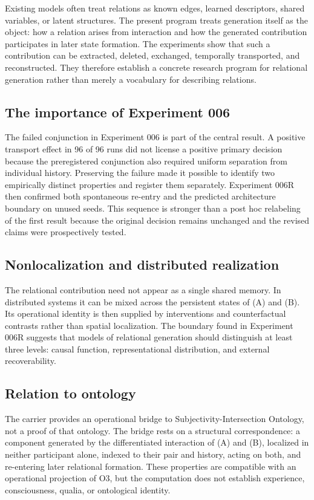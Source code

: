 \documentclass[11pt,a4paper]{article}
\begin{document}
Existing models often treat relations as known edges, learned descriptors, shared variables, or latent structures. The present program treats generation itself as the object: how a relation arises from interaction and how the generated contribution participates in later state formation. The experiments show that such a contribution can be extracted, deleted, exchanged, temporally transported, and reconstructed. They therefore establish a concrete research program for relational generation rather than merely a vocabulary for describing relations.

\subsection{The importance of Experiment 006}

The failed conjunction in Experiment 006 is part of the central result. A positive transport effect in 96 of 96 runs did not license a positive primary decision because the preregistered conjunction also required uniform separation from individual history. Preserving the failure made it possible to identify two empirically distinct properties and register them separately. Experiment 006R then confirmed both spontaneous re-entry and the predicted architecture boundary on unused seeds. This sequence is stronger than a post hoc relabeling of the first result because the original decision remains unchanged and the revised claims were prospectively tested.

\subsection{Nonlocalization and distributed realization}

The relational contribution need not appear as a single shared memory. In distributed systems it can be mixed across the persistent states of (A) and (B). Its operational identity is then supplied by interventions and counterfactual contrasts rather than spatial localization. The boundary found in Experiment 006R suggests that models of relational generation should distinguish at least three levels: causal function, representational distribution, and external recoverability.

\subsection{Relation to ontology}

The carrier provides an operational bridge to Subjectivity-Intersection Ontology, not a proof of that ontology. The bridge rests on a structural correspondence: a component generated by the differentiated interaction of (A) and (B), localized in neither participant alone, indexed to their pair and history, acting on both, and re-entering later relational formation. These properties are compatible with an operational projection of O3, but the computation does not establish experience, consciousness, qualia, or ontological identity.
\end{document}
